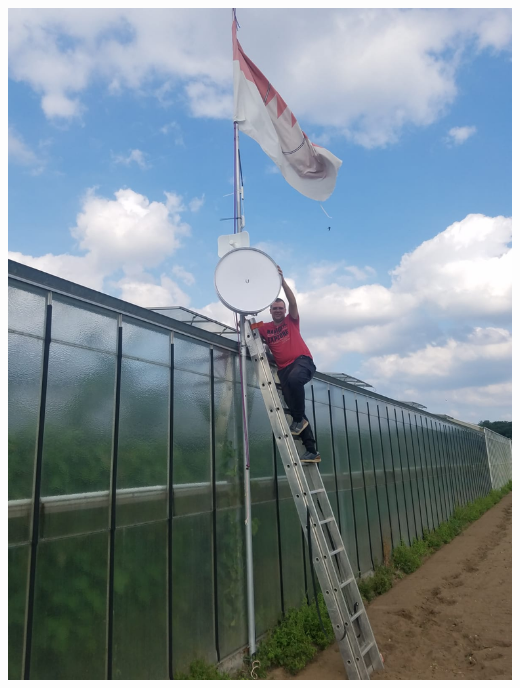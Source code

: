 \documentclass{beamer}
\begin{document}
	\begin{frame}
		\includegraphics[height=0.75\framewidth]{media/p2p-treibhaus.jpg}
	\end{frame}
\end{document}
